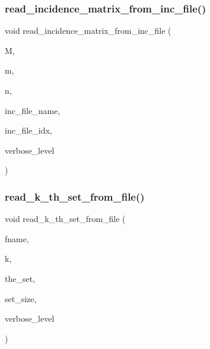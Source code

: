 \subsubsection{\texorpdfstring{read\+\_\+incidence\+\_\+matrix\+\_\+from\+\_\+inc\+\_\+file()}{read\_incidence\_matrix\_from\_inc\_file()}}
{\footnotesize\ttfamily void read\+\_\+incidence\+\_\+matrix\+\_\+from\+\_\+inc\+\_\+file (\begin{DoxyParamCaption}\item[{\mbox{\hyperlink{galois_8h_a09fddde158a3a20bd2dcadb609de11dc}{I\+NT}} $\ast$\&}]{M,  }\item[{\mbox{\hyperlink{galois_8h_a09fddde158a3a20bd2dcadb609de11dc}{I\+NT}} \&}]{m,  }\item[{\mbox{\hyperlink{galois_8h_a09fddde158a3a20bd2dcadb609de11dc}{I\+NT}} \&}]{n,  }\item[{\mbox{\hyperlink{galois_8h_ab6cc7b4aeb6ea31aba2b3fbfc83ff5e6}{B\+Y\+TE}} $\ast$}]{inc\+\_\+file\+\_\+name,  }\item[{\mbox{\hyperlink{galois_8h_a09fddde158a3a20bd2dcadb609de11dc}{I\+NT}}}]{inc\+\_\+file\+\_\+idx,  }\item[{\mbox{\hyperlink{galois_8h_a09fddde158a3a20bd2dcadb609de11dc}{I\+NT}}}]{verbose\+\_\+level }\end{DoxyParamCaption})}

\mbox{\label{util_8_c_aad3a1f5b1aaa9d7fa8b290fc1f8e259f}} 
\subsubsection{\texorpdfstring{read\+\_\+k\+\_\+th\+\_\+set\+\_\+from\+\_\+file()}{read\_k\_th\_set\_from\_file()}}
{\footnotesize\ttfamily void read\+\_\+k\+\_\+th\+\_\+set\+\_\+from\+\_\+file (\begin{DoxyParamCaption}\item[{const \mbox{\hyperlink{galois_8h_ab6cc7b4aeb6ea31aba2b3fbfc83ff5e6}{B\+Y\+TE}} $\ast$}]{fname,  }\item[{\mbox{\hyperlink{galois_8h_a09fddde158a3a20bd2dcadb609de11dc}{I\+NT}}}]{k,  }\item[{\mbox{\hyperlink{galois_8h_a09fddde158a3a20bd2dcadb609de11dc}{I\+NT}} $\ast$\&}]{the\+\_\+set,  }\item[{\mbox{\hyperlink{galois_8h_a09fddde158a3a20bd2dcadb609de11dc}{I\+NT}} \&}]{set\+\_\+size,  }\item[{\mbox{\hyperlink{galois_8h_a09fddde158a3a20bd2dcadb609de11dc}{I\+NT}}}]{verbose\+\_\+level }\end{DoxyParamCaption})}

